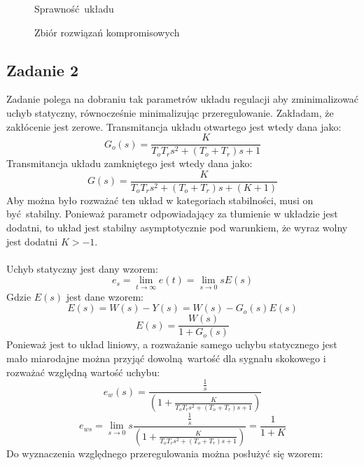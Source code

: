 \documentclass[a4paper, 12pt]{article}
\begin{document}
            \begin{figure}[H]
                \centering
                \def \svgwidth{0.7\columnwidth}
                
                \caption{Sprawność układu}
            \end{figure}\noindent
            \begin{figure}[H]
                \centering
                \def \svgwidth{0.7\columnwidth}
                
                \caption{Zbiór rozwiązań kompromisowych}
            \end{figure}\noindent
        \subsection{Zadanie 2}
            Zadanie polega na dobraniu tak parametrów układu regulacji aby zminimalizować uchyb
            statyczny, równocześnie minimalizując przeregulowanie. Zakładam, że zakłócenie jest
            zerowe. Transmitancja układu otwartego jest wtedy dana jako:
            $$
                G_o(s) = \frac{K}{T_oT_rs^2 + (T_o + T_r)s + 1}
            $$
            Transmitancja układu zamkniętego jest wtedy dana jako:
            $$
                G(s) = \frac{K}{T_oT_rs^2 + (T_o + T_r)s + (K + 1)}
            $$
            Aby można było rozważać ten układ w kategoriach stabilności, musi on być stabilny. Ponieważ
            parametr odpowiadający za tłumienie w układzie jest dodatni, to układ jest stabilny
            asymptotycznie pod warunkiem, że wyraz wolny jest dodatni $K > -1$.
            \\ \\
            Uchyb statyczny jest dany wzorem:
            $$
                e_s =  \lim_{t \to \infty} e(t) = \lim_{s \to 0} sE(s)
            $$
            Gdzie $E(s)$ jest dane wzorem:
            $$
                E(s) = W(s) - Y(s) = W(s) - G_o(s) E(s)
            $$
            $$
                E(s) = \frac{W(s)}{1 + G_o(s)}
            $$
            Ponieważ jest to układ liniowy, a rozważanie samego uchybu statycznego jest mało miarodajne
            można przyjąć dowolną wartość dla sygnału skokowego i rozważać względną wartość uchybu:
            $$
                e_w(s) = \frac{\frac{1}{s}}{(1 + \frac{K}{T_oT_rs^2 + (T_o + T_r)s + 1})}
            $$
            $$
                e_{ws} = \lim_{s \to 0} s \frac{\frac{1}{s}}{(1 + \frac{K}{T_oT_rs^2 + 
                    (T_o + T_r)s + 1})} = \frac{1}{1 + K}
            $$
            Do wyznaczenia względnego przeregulowania można posłużyć się wzorem:
\end{document}

